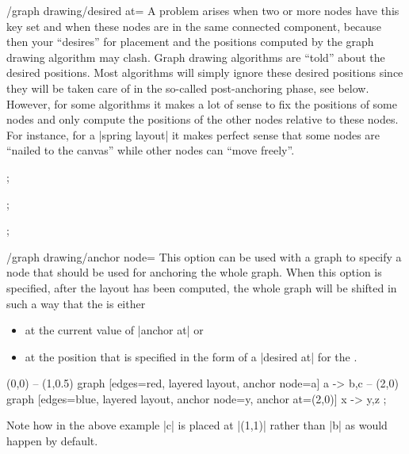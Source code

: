 \begin{key}{/graph drawing/desired at=}
  A problem arises when two or more nodes have this key set
  and when these nodes are in the same connected component, because
  then your ``desires'' for placement and the positions computed by
  the graph drawing algorithm may clash. Graph drawing algorithms are
  ``told'' about the desired positions. Most algorithms will simply
  ignore these desired positions since they will be taken care of in
  the so-called post-anchoring phase, see below. However, for some
  algorithms it makes a lot of sense to fix the positions of some
  nodes and only compute the positions 
  of the other nodes relative to these nodes. For instance, for a
  |spring layout| it makes perfect sense that some nodes are
  ``nailed to the canvas'' while other nodes can ``move freely''.
\begin{codeexample}[]
\tikz {};
\end{codeexample}
\begin{codeexample}[]
\tikz {};
\end{codeexample}
\begin{codeexample}[]
\tikz {};
\end{codeexample}
\end{key}


\begin{key}{/graph drawing/anchor node=}
  This option can be used with a graph to specify a node that should
  be used for anchoring the whole graph. When this option is
  specified, after the layout has been computed, the whole graph will
  be shifted in such a way that the  is either
  \begin{itemize}
  \item at the current value of |anchor at| or 
  \item at the position that is specified in the form of a
    |desired at| for the .
  \end{itemize}
\begin{codeexample}[]
\tikz \draw (0,0)
  -- (1,0.5) graph [edges=red,  layered layout, anchor node=a] { a -> {b,c} }
  -- (2,0)   graph [edges=blue, layered layout,
                    anchor node=y, anchor at={(2,0)}]          { x -> {y,z} };
\end{codeexample}
\begin{codeexample}[]
\end{codeexample}
  Note how in the above example |c| is placed at |(1,1)| rather than
  |b| as would happen by default.
\end{key}

